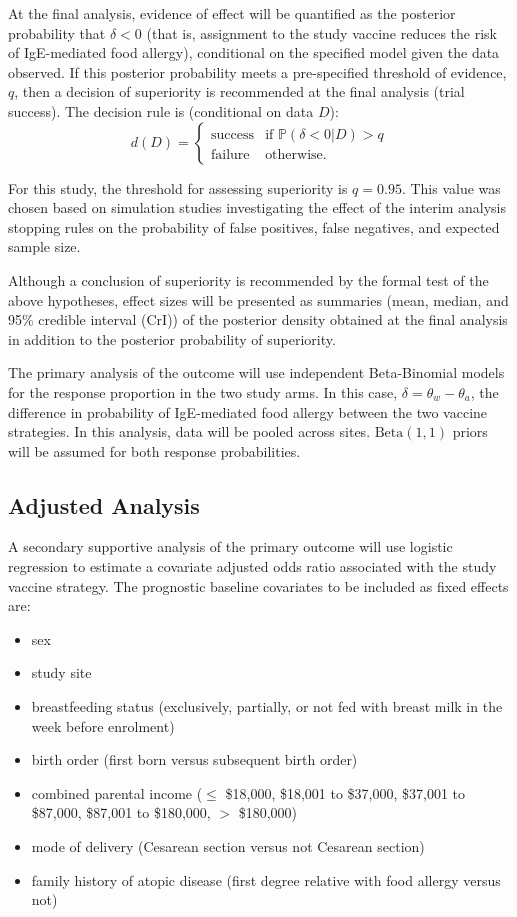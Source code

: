 \documentclass{bmcart}
\begin{document}
At the final analysis, evidence of effect will be quantified as the posterior probability that $\delta < 0$ (that is, assignment to the study vaccine reduces the risk of IgE-mediated food allergy), conditional on the specified model given the data observed.
If this posterior probability meets a pre-specified threshold of evidence, \(q\), then a decision of superiority is recommended at the final analysis (trial success).
The decision rule is (conditional on data $D$):
$$
d(D) = \begin{cases}
\text{success} & \text{if } \mathbb{P}(\delta<0|D)>q \\
\text{failure}\ & \text{otherwise}.
\end{cases}
$$

For this study, the threshold for assessing superiority is $q=0.95$.
This value was chosen based on simulation studies investigating the effect of the interim analysis stopping rules on the probability of false positives, false negatives, and expected sample size.

Although a conclusion of superiority is recommended by the formal test of the above hypotheses, effect sizes will be presented as summaries (mean, median, and 95\% credible interval (CrI)) of the posterior density obtained at the final analysis in addition to the posterior probability of superiority.

The primary analysis of the outcome will use independent Beta-Binomial models for the response proportion in the two study arms.
In this case, $\delta=\theta_w-\theta_a$, the difference in probability of IgE-mediated food allergy between the two vaccine strategies.
In this analysis, data will be pooled across sites.
$\text{Beta}(1,1)$ priors will be assumed for both response probabilities.

\subsection*{Adjusted Analysis}

A secondary supportive analysis of the primary outcome will use logistic regression to estimate a covariate adjusted odds ratio associated with the study vaccine strategy.
The prognostic baseline covariates to be included as fixed effects are:
\begin{itemize}
	\item sex
	\item study site
	\item breastfeeding status (exclusively, partially, or not fed with breast milk in the week before enrolment)
	\item birth order (first born versus subsequent birth order)
	\item combined parental income ($\leq$ \$18,000, \$18,001 to \$37,000, \$37,001 to \$87,000, \$87,001 to \$180,000, $>$ \$180,000)
	\item mode of delivery (Cesarean section versus not Cesarean section)
	\item family history of atopic disease (first degree relative with food allergy versus not)
\end{itemize}
\end{document}

